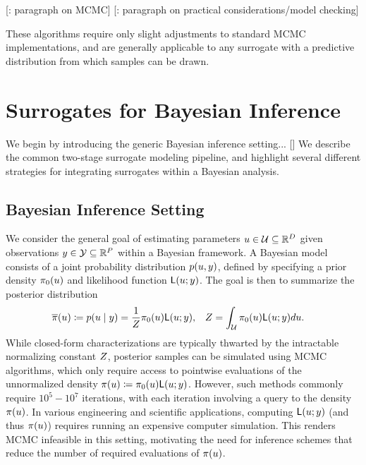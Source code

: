\documentclass[12pt]{article}
\begin{document}
[\todo: paragraph on MCMC] [\todo: paragraph on practical considerations/model checking]

These algorithms require only
slight adjustments to standard MCMC implementations, and are generally applicable to any 
surrogate with a predictive distribution from which samples can be drawn.

\section{Surrogates for Bayesian Inference}
We begin by introducing the generic Bayesian inference setting... [\todo]
We describe the common two-stage surrogate modeling pipeline, and highlight 
several different strategies for integrating surrogates within a Bayesian analysis.

\subsection{Bayesian Inference Setting}
We consider the general goal of estimating parameters $u \in \mathcal{U} \subseteq \mathbb{R}^{D}$ given 
observations $y \in \mathcal{Y} \subseteq \mathbb{R}^{P}$ within a Bayesian framework.
A Bayesian model consists of a joint probability distribution $p(u, y)$, defined by 
specifying a prior density $\pi_0(u)$ and likelihood function $\mathsf{L}(u; y)$.
The goal is then to summarize the posterior distribution 
\begin{align}
&\overline{\pi}(u) \coloneqq p(u \mid y) = \frac{1}{Z} \pi_0(u) \mathsf{L}(u; y), 
&&Z = \int_{\mathcal{U}} \pi_0(u) \mathsf{L}(u; y) du. \label{eq:post_dens_generic}
\end{align}
While closed-form characterizations are typically thwarted by the intractable normalizing constant
$Z$, posterior samples can be simulated using MCMC algorithms, which only require 
access to pointwise evaluations of the unnormalized density 
$\pi(u) \coloneqq \pi_0(u) \mathsf{L}(u; y)$.
However, such methods commonly require $10^5 - 10^7$ iterations, with each iteration 
involving a query to the density $\pi(u)$.
In various engineering and scientific applications, computing $\mathsf{L}(u; y)$ (and thus
$\pi(u)$) requires running an expensive computer simulation. 
This renders MCMC infeasible in this setting, motivating the need for inference schemes 
that reduce the number of required evaluations of $\pi(u)$.
 
\end{document}
